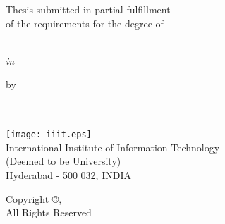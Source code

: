 
\thispagestyle{empty}
\begin{center}
    \vspace*{1.5cm}
    {\Large \bf \thesisTitle}

    \vspace{3.75cm}
    {\large Thesis submitted in partial fulfillment \\}
    {\large of the requirements for the degree of \\}

    \vspace{1cm}
    {
        \it \large \thesisDegree \space \\
        in \\
        \textbf{\thesisProgramme}
    }

    \vspace{1cm}
    {\large by \\}
    \vspace{5mm}
    {\large 
        \myName \\
        \myRollNo \\
        {\small \tt \myEmail}
    }

    \vspace{4cm}
    \texttt{[image: iiit.eps]} \\
    {\large
        International Institute of Information Technology \\
        (Deemed to be University) \\
        Hyderabad - 500 032, INDIA \\
        \thesisMonth \space \thesisYear
    }
\end{center}

\newpage
\thispagestyle{empty}
\vspace*{\fill} %
\begin{center}
    {\large
        Copyright \copyright \space \myName, \thesisYear \\
        \vspace{3mm}
        All Rights Reserved
    }
\end{center}
\vspace*{\fill}
